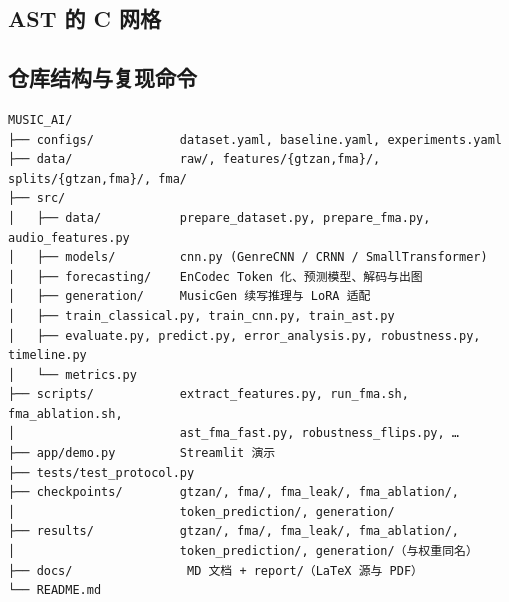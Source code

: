 \documentclass[UTF8,10pt,a4paper]{ctexart}
\begin{document}


\subsection{AST 的 C 网格}



\subsection{仓库结构与复现命令}

{\setmonofont{WenQuanYi Micro Hei Mono}%
\begin{verbatim}
MUSIC_AI/
├── configs/            dataset.yaml, baseline.yaml, experiments.yaml
├── data/               raw/, features/{gtzan,fma}/, splits/{gtzan,fma}/, fma/
├── src/
│   ├── data/           prepare_dataset.py, prepare_fma.py, audio_features.py
│   ├── models/         cnn.py (GenreCNN / CRNN / SmallTransformer)
│   ├── forecasting/    EnCodec Token 化、预测模型、解码与出图
│   ├── generation/     MusicGen 续写推理与 LoRA 适配
│   ├── train_classical.py, train_cnn.py, train_ast.py
│   ├── evaluate.py, predict.py, error_analysis.py, robustness.py, timeline.py
│   └── metrics.py
├── scripts/            extract_features.py, run_fma.sh, fma_ablation.sh,
│                       ast_fma_fast.py, robustness_flips.py, …
├── app/demo.py         Streamlit 演示
├── tests/test_protocol.py
├── checkpoints/        gtzan/, fma/, fma_leak/, fma_ablation/,
│                       token_prediction/, generation/
├── results/            gtzan/, fma/, fma_leak/, fma_ablation/,
│                       token_prediction/, generation/（与权重同名）
├── docs/                MD 文档 + report/（LaTeX 源与 PDF）
└── README.md
\end{verbatim}
}
\end{document}
